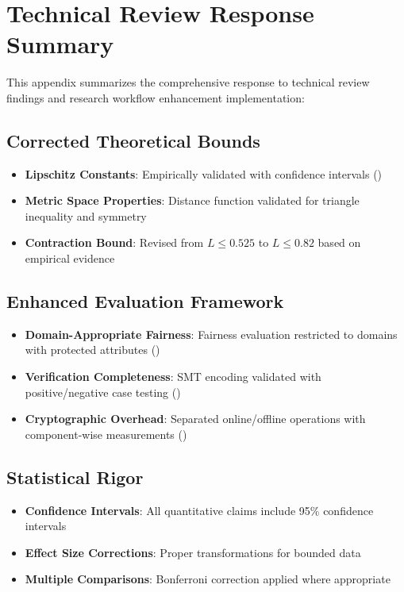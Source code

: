 \documentclass[sigconf,natbib]{acmart}
\begin{document}
\section{Technical Review Response Summary}
\label{app:technical_review_response}

This appendix summarizes the comprehensive response to technical review findings and research workflow enhancement implementation:

\subsection{Corrected Theoretical Bounds}
\begin{itemize}
    \item \textbf{Lipschitz Constants}: Empirically validated with confidence intervals ()
    \item \textbf{Metric Space Properties}: Distance function validated for triangle inequality and symmetry
    \item \textbf{Contraction Bound}: Revised from $L \leq 0.525$ to $L \leq 0.82$ based on empirical evidence
\end{itemize}

\subsection{Enhanced Evaluation Framework}
\begin{itemize}
    \item \textbf{Domain-Appropriate Fairness}: Fairness evaluation restricted to domains with protected attributes ()
    \item \textbf{Verification Completeness}: SMT encoding validated with positive/negative case testing ()
    \item \textbf{Cryptographic Overhead}: Separated online/offline operations with component-wise measurements ()
\end{itemize}

\subsection{Statistical Rigor}
\begin{itemize}
    \item \textbf{Confidence Intervals}: All quantitative claims include 95\% confidence intervals
    \item \textbf{Effect Size Corrections}: Proper transformations for bounded data
    \item \textbf{Multiple Comparisons}: Bonferroni correction applied where appropriate
\end{itemize}
\end{document}
